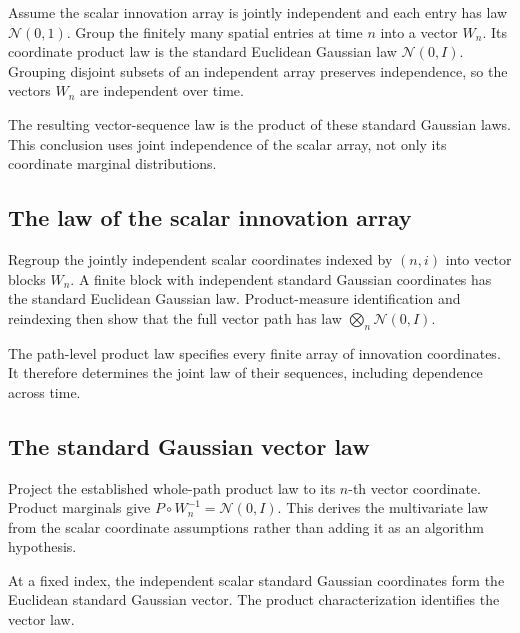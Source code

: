 \documentclass[11pt,a4paper]{report}
\begin{document}
Assume the scalar innovation array is jointly independent and each entry has law \(\mathcal N(0,1)\). Group the finitely many spatial entries at time \(n\) into a vector \(W_n\). Its coordinate product law is the standard Euclidean Gaussian law \(\mathcal N(0,I)\). Grouping disjoint subsets of an independent array preserves independence, so the vectors \(W_n\) are independent over time.



The resulting vector-sequence law is the product of these standard Gaussian laws. This conclusion uses joint independence of the scalar array, not only its coordinate marginal distributions.

\subsection{\texorpdfstring{The law of the scalar innovation array}{The law of the scalar innovation array}}
\label{report-step-UnadjustedLangevin-GaussianInnovationVectors-lean-1}


Regroup the jointly independent scalar coordinates indexed by \((n,i)\) into vector blocks \(W_n\). A finite block with independent standard Gaussian coordinates has the standard Euclidean Gaussian law. Product-measure identification and reindexing then show that the full vector path has law \(\bigotimes_n\mathcal N(0,I)\).



The path-level product law specifies every finite array of innovation coordinates. It therefore determines the joint law of their sequences, including dependence across time.

\subsection{\texorpdfstring{The standard Gaussian vector law}{The standard Gaussian vector law}}
\label{report-step-UnadjustedLangevin-GaussianInnovationVectors-lean-2}


Project the established whole-path product law to its \(n\)-th vector coordinate. Product marginals give \(P\circ W_n^{-1}=\mathcal N(0,I)\). This derives the multivariate law from the scalar coordinate assumptions rather than adding it as an algorithm hypothesis.



At a fixed index, the independent scalar standard Gaussian coordinates form the Euclidean standard Gaussian vector. The product characterization identifies the vector law.
\end{document}
